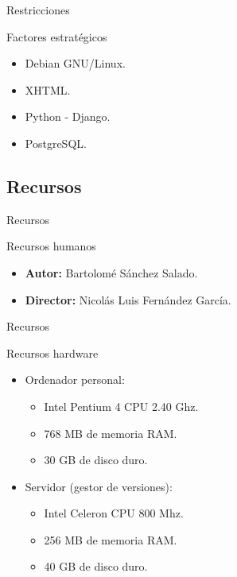 \documentclass[10pt, hyperref={pdfpagelabels=false}]{beamer}
\begin{document}
      \begin{frame}{Restricciones}
        \begin{block}{Factores estratégicos}
          \begin{itemize}
           \item Debian GNU/Linux.
           \item XHTML.
           \item Python - Django.
           \item PostgreSQL.
          \end{itemize}
        \end{block}
      \end{frame}


    \subsection{Recursos}
      \begin{frame}{Recursos}
        \begin{block}{Recursos humanos}
          \begin{itemize}
           \item \textbf{Autor:} Bartolomé Sánchez Salado.
           \item \textbf{Director:} Nicolás Luis Fernández García.
          \end{itemize}
        \end{block}
      \end{frame}

      \begin{frame}{Recursos}
        \begin{block}{Recursos hardware}
          \begin{itemize}
            \item Ordenador personal:
            \begin{itemize}
              \item Intel Pentium 4 CPU 2.40 Ghz.
              \item 768 MB de memoria RAM.
              \item 30 GB de disco duro.
            \end{itemize}
            \item Servidor (gestor de versiones):
            \begin{itemize}
              \item Intel Celeron CPU 800 Mhz.
              \item 256 MB de memoria RAM.
              \item 40 GB de disco duro.
            \end{itemize}
          \end{itemize}
        \end{block}
      \end{frame}
\end{document}
